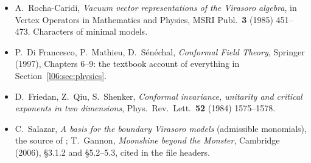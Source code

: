 \begin{itemize}
{  null vectors}, Phys.\ Lett.\ B \textbf{215} (1988) 517--522.
\item A.~Rocha-Caridi, \emph{Vacuum vector representations of the Virasoro algebra}, in Vertex Operators in
  Mathematics and Physics, MSRI Publ.\ \textbf{3} (1985) 451--473. Characters of minimal models.
\item P.~Di Francesco, P.~Mathieu, D.~S\'en\'echal, \emph{Conformal Field Theory}, Springer (1997), Chapters 6--9:
  the textbook account of everything in Section~\ref{l06:sec:physics}.
\item D.~Friedan, Z.~Qiu, S.~Shenker, \emph{Conformal invariance, unitarity and critical exponents in two
  dimensions}, Phys.\ Rev.\ Lett.\ \textbf{52} (1984) 1575--1578.
\item C.~Salazar, \emph{A basis for the boundary Virasoro models} (admissible monomials), the source of
  ; T.~Gannon, \emph{Moonshine beyond the Monster}, Cambridge (2006),
  \S3.1.2 and \S5.2--5.3, cited in the file headers.
\end{itemize}

\endgroup
